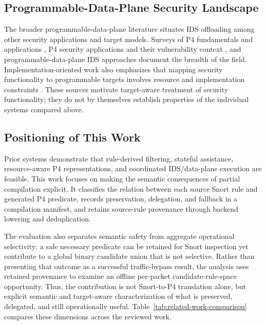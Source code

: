 \documentclass{article}
\begin{document}
\subsection{Programmable-Data-Plane Security Landscape}
The broader programmable-data-plane literature situates IDS offloading among
other security applications and target models. Surveys of P4 fundamentals and
applications \cite{hauser2023p4survey}, P4 security applications and their
vulnerability context \cite{alsabeh2022p4securitysurvey}, and
programmable-data-plane IDS approaches \cite{fida2026pdpids} document the
breadth of the field. Implementation-oriented work also emphasizes that
mapping security functionality to programmable targets involves resource and
implementation constraints \cite{mazloum2025p4security}. These sources
motivate target-aware treatment of security functionality; they do not by
themselves establish properties of the individual systems compared above.

\subsection{Positioning of This Work}
Prior systems demonstrate that rule-derived filtering, stateful assistance,
resource-aware P4 representations, and coordinated IDS/data-plane execution
are feasible. This work focuses on making the semantic consequences of
partial compilation explicit. It classifies the relation between each source
Snort rule and generated P4 predicate, records preservation, delegation, and
fallback in a compilation manifest, and retains source-rule provenance through
backend lowering and deduplication.

The evaluation also separates semantic safety from aggregate operational
selectivity: a safe necessary predicate can be retained for Snort inspection
yet contribute to a global binary candidate union that is not selective.
Rather than presenting that outcome as a successful traffic-bypass result,
the analysis uses retained provenance to examine an offline per-packet
candidate-rule-space opportunity. Thus, the contribution is not Snort-to-P4
translation alone, but explicit semantic and target-aware characterization of
what is preserved, delegated, and still operationally useful.
Table~\ref{tab:related-work-comparison} compares these dimensions across the
reviewed work.
\end{document}
